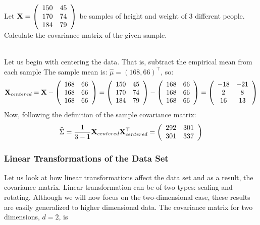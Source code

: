 \begin{exercise}
Let $\mathbf{X}=\left(\begin{array}{cc} 150 & 45\\ 170 & 74\\ 184 & 79 \end{array}\right)$ be samples of height and weight of 3 different people. Calculate the covariance matrix of the given sample.

~\\Let us begin with centering the data. That is, subtract the empirical mean from each sample
The sample mean is: $\widehat{\mu}=\left(168,66\right)^\top$, so:
$$\mathbf{X}_{centered}=\mathbf{X} - \left(\begin{array}{cc}
	168 & 66\\
	168 & 66\\
	168 & 66
\end{array}
\right)
=\left(\begin{array}{cc}
	150 & 45\\
	170 & 74\\
	184 & 79
\end{array}\right) - \left(\begin{array}{cc}
	168 & 66\\
	168 & 66\\
	168 & 66
\end{array}
\right)
=\left(\begin{array}{cc}
	-18 & -21\\
	2 & 8\\
	16 & 13
\end{array}\right)$$
Now, following the definition of the sample covariance matrix:
$$
\widehat{\Sigma} = \frac{1}{3-1}\mathbf{X}_{centered}\mathbf{X}_{centered}^\top=\left(\begin{array}{cc}
	292 & 301\\
	301 & 337
\end{array}\right)
$$
\end{exercise}


\subsubsection{Linear Transformations of the Data Set}
Let us look at how linear transformations affect the data set and as a result, the covariance matrix. Linear transformation can be of two types: scaling and rotating. Although we will now focus on the two-dimensional case, these results are easily generalized to higher dimensional data. The covariance matrix for two dimensions, $d=2$, is

